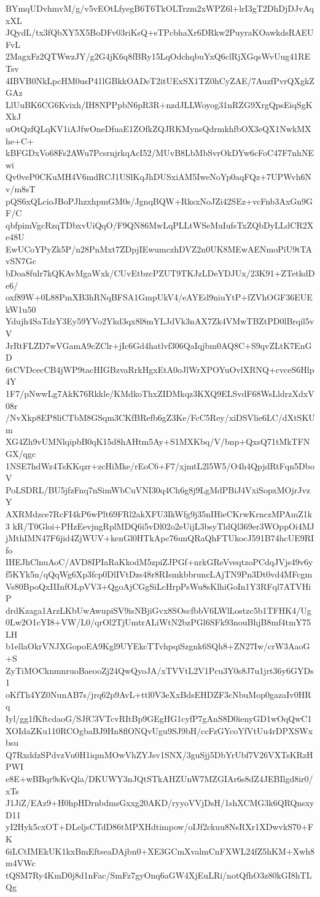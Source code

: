 BYmqUDvhmvM/g/v5vEOtLfyegB6T6TkOLTrzm2xWPZ6l+lrI3gT2DhDjDJvAqxXL
JQydL/tx3fQbXY5X5BoDFv03riKsQ+sTPcbhaXr6DRkw2PuyraKOawkdsRAEUFvL
2MagxFz2QTWwzJY/g2G4jK6q8fBRy15LqOdchqbuYxQ6clRjXGqsWvUug41RETsv
4IBVB0NkLpcHM0usP41lGBkkOADeT2itUExSX1TZ0hCyZAE/7AuzfPvrQXgkZGAz
LlUuBK6CG6Kvixh/IH8NPPpbN6pR3R+nzdJLLWoyog31nRZG9XrgQpsEiqSgKXkJ
uOtQzfQLqKV1iAJfwOneDfuaE1ZOfkZQJRKMynsQdrmkhfbOX3eQX1NwkMXhe+C+
kBFGDxVo68Fs2AWu7PcsrnjrkqAcI52/MUvB8LbMbSvrOkDYw6cFoC47F7nhNEwi
Qv0veP0CKuMH4V6mdRCJ1USlKqJhDUSxiAM5IweNoYp0aqFQz+7UPWvh6Nv/m8sT
pQS6xQLcioJBoPJhzxhpmGM0s/JgnqBQW+RksxNoJZi42SEz+vcFnb3AxGn9GF/C
qbfpimVgcRzqTDbxvUiQqO/F9QN86MwLqPLLtWSeMuIufsTxZQbDyLLdCR2Xe48U
EwUCoYPyZk5P/n28PnMxt7ZDpjIEwumczhDVZ2n0UK8MEwAENmoPiU9tTAvSN7Gc
bDoa8fulr7kQKAvMgaWxk/CUvEtbzcPZUT9TKJzLDeYDJUx/23K91+ZTetkdDe6/
oxf89W+0L88PmXB3hRNqBFSA1GmpUkV4/eAYEd9niuYtP+fZVhOGF36EUEkW1u50
Ydujh4SaTdzY3Ey59YVo2Ykd3qx8l8mYLJdVk3nAX7Zk4VMwTBZtPD0lBrqil5vV
JrRtFLZD7wVGamA9cZClr+jIc6Gd4hatlvf306QaIqjbm0AQ8C+S9qvZLtK7EnGD
6tCVDcecCB4jWP9tacHIGBzvaRrkHgxEtA0oJlWrXPOYuOvlXRNQ+cvceS6Hlp4Y
1F7/pNwwLg7AkK76Rkkle/KMdkoThxZIDMkqz3KXQ9ELSvdF68WsLldrzXdxV08r
/NvXkp8EP8liCTbM8GSqm3CKfBRefb6gZ3Ke/FcC5Rey/xiDSVlie6LC/dXtSKUm
XG4Zh9vUMNlqipbB0qK15d8hAHtm5Ay+S1MXKbq/V/bnp+QxsQ71tMkTFNGX/qgc
1NSE7hdWz4TsKKqzr+zcHiMke/rEoC6+F7/xjmtL2l5W5/O4h4QpjdRtFqn5DboV
PoLSDRL/BU5jfzFnq7nSimWbCuVNI30q4Ch6g8j9LgMdPBiJ4VxiSopxMOjrJvzY
AXRMdzce7RcFI4kP6wPlt69FRl2akXFU3IkWfg9j35nIHieCKrwKrnczMPAmZ1k3
kR/T0Gloi+PHzEevjngRplMDQ6i5vDl02o2eUijL3bsyTldQl369er3WOppOi4MJ
jMthIMN47F6jid4ZjWUV+kenGl0HTkApc76unQRaQhFTUkocJ591B74hcUE9RIfo
IHEJhClnuAoC/AVD8IPIaRaKkodM5zpiZJPGf+nrkGReVveqtzoPCdqJVjs49v6y
f5KYk5n/qQqWg6Xp3fcp0DlIVtDzs48r8RIsmkbbruncLAjTN9Pn3Dt0vd4MFcgm
Vs80BpoQxIIInfOLpVV3+QgoAjCGgSiLcHrpPsWu8sKlhiGoIn1Y3RFql7ATVHiP
drdKzaga1ArzLKbUwAwupiSV9isNBjiGvx8SOscfbbV6LWlLostzc5b1TFHK4/Ug
0Lw2O1cYI8+VW/L0/qrOl2TjUmtrALiWtN2bzPGl6SFk93nouBhjB8mf4tmY75LH
b1ellaOkrVNJXGopoEA9Kgl9UYEkcTTvhpqiSzgnk6SQh8+ZN27Iw/crW3AaoG+S
ZyTiMOCknmnruoBaeooZj24QwQyoJA/xTVVtL2V1Pcu3Y0s8J7u1jrt36y6GYDs1
oKfTh4YZ0NunAB7s/jrq62p9AvL+ttl0V3eXxBdsEHDZF3cNbuMop0gazaIv0HRq
Iyl/gg1fKftcdaoG/SJfC3VTcvRItBp9GEgHG1cyfP7gAnS8D0ienyGD1wOqQwC1
XOIdaZKu110RCOgbaBJ9Hn8flONQvUgu9SJ9bH/ccFzGYcoYfVtUu4rDPXSWxbsu
Q7RxddzSPdvzVu0H1iqmMOwVhZYJsv1SNX/3guSjj5DbYrUbf7V26VXTsKRzHPWI
e8E+wBBqr9sKvQla/DKUWY3nJQtSTkAHZUnW7MZGIAr6s8dZ4JEBIlgd8ir0/xTs
J1JiZ/EAz9+H0hpHDrnbdmsGxxg20AKD/ryyoVVjDsH/1shXCMG3k6QRQnsxyD11
yI2Hyk5cxOT+DLeljsCTdD86tMPXHdtimpow/oIJf2ckuu8NsRXr1XDwvkS70+FK
6iLCtIMEkUK1kxBmEftseaDAjbn0+XE3GCmXvalmCnFXWL24fZ5hKM+Xwh8m4VWc
tQSM7Ry4KmD0j8d1nFac/SmFz7gyOnq6aGW4XjEuLRi/notQfhO3z80kGI8hTLQg
